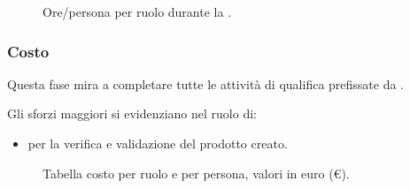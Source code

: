 \begin{figure}[H]
\caption{Ore/persona per ruolo durante la \VV.}
\label{fig:vv2}

\end{figure}


\pagebreak

\subsubsection{Costo \VV}
\introcosto{\VV}
Questa fase mira a completare tutte le attività di qualifica prefissate da {\hx}.

Gli sforzi maggiori si evidenziano nel ruolo di:
\begin{itemize}
\item {\Vx} per la verifica e validazione del prodotto creato.
\end{itemize}

\begin{figure}[H]
\label{tab:vv}

  \caption{Tabella costo {\VV} per ruolo e per persona, valori in euro (\euro).}
\end{figure}

